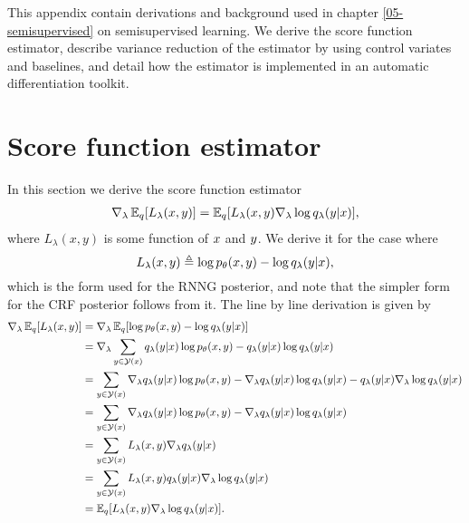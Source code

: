 This appendix contain derivations and background used in chapter \ref{05-semisupervised} on semisupervised learning. We derive the score function estimator, describe variance reduction of the estimator by using control variates and baselines, and detail how the estimator is implemented in an automatic differentiation toolkit.

\section{Score function estimator}
  In this section we derive the score function estimator
  \begin{align}
    \label{eq:score-function-estimator}
    \nabla_{\lambda} \operatorname{\mathbb{E}}_{q} [ L_{\lambda}(x, y) ] = \operatorname{\mathbb{E}}_{q} [ L_{\lambda}(x, y) \nabla_{\lambda} \log q_{\lambda}(y | x) ],
  \end{align}
  where $L_{\lambda}(x, y)$ is some function of $x$ and $y$. We derive it for the case where
  \begin{equation*}
    L_{\lambda}(x, y) \triangleq \log p_{\theta}(x, y) - \log q_{\lambda}(y | x),
  \end{equation*}
  which is the form used for the RNNG posterior, and note that the simpler form for the CRF posterior follows from it. The line by line derivation is given by
  \begin{align*}
    \nabla_{\lambda} \operatorname{\mathbb{E}}_{q} [ L_{\lambda}(x, y) ] &=
    \nabla_{\lambda} \operatorname{\mathbb{E}}_{q} [ \log p_{\theta}(x, y) - \log q_{\lambda}(y | x) ] \\
      &= \nabla_{\lambda} \sum_{y \in \mathcal{Y}(x)} q_{\lambda}(y | x) \log p_{\theta}(x, y) - q_{\lambda}(y | x)\log q_{\lambda}(y | x) \\
      &= \sum_{y \in \mathcal{Y}(x)} \nabla_{\lambda} q_{\lambda}(y | x) \log p_{\theta}(x, y)  - \nabla_{\lambda} q_{\lambda}(y | x)\log q_{\lambda}(y | x) -  q_{\lambda}(y | x)\nabla_{\lambda}\log q_{\lambda}(y | x) \\
      &= \sum_{y \in \mathcal{Y}(x)} \nabla_{\lambda} q_{\lambda}(y | x) \log p_{\theta}(x, y) - \nabla_{\lambda} q_{\lambda}(y | x)\log q_{\lambda}(y | x) \\
      &= \sum_{y \in \mathcal{Y}(x)} L_{\lambda}(x, y)\nabla_{\lambda} q_{\lambda}(y | x) \\
      &= \sum_{y \in \mathcal{Y}(x)} L_{\lambda}(x, y) q_{\lambda}(y | x) \nabla_{\lambda} \log q_{\lambda}(y | x)   \\
      &= \operatorname{\mathbb{E}}_{q} [ L_{\lambda}(x, y) \nabla_{\lambda} \log q_{\lambda}(y | x) ].
  \end{align*}

